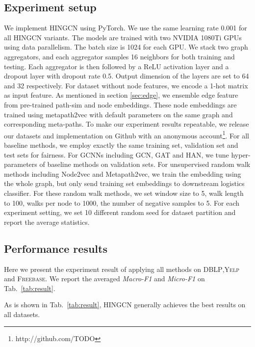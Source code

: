 \subsection{Experiment setup}
\label{sec:setup}
We implement HINGCN using PyTorch. We use the same learning rate 0.001 for all HINGCN variants. The models  are trained with two NVIDIA 1080Ti GPUs using data parallelism. The batch size is 1024 for each GPU. We stack two graph aggregators, and each aggregator samples 16 neighbors for both training and testing. Each aggregator is then followed by a ReLU activation layer and a dropout layer with dropout rate 0.5. Output dimension of the layers are set to 64 and 32 respectively. For dataset without node features, we encode a 1-hot matrix as input feature. As mentioned in section \ref{sec:edge}, we ensemble edge feature from pre-trained path-sim and node embeddings. These node embeddings are trained using metapath2vec \citep{DongCS17} with default parameters on the same graph and corresponding meta-paths. 
To make our experiment results repeatable, we release our datasets and implementation on Github with an anonymous account\footnote{http://github.com/TODO}.
For all baseline methods, we employ exactly the same training set, validation set and test sets for fairness. For GCNNs including GCN, GAT and HAN, we tune hyper-parameters of baseline methods on validation sets. For unsupervised random walk methods including Node2vec and Metapath2vec, we train the embedding using the whole graph, but only send training set embeddings to downstream logistics classifier. For these random walk methods, we set window size to 5, walk length to 100, walks per node to 1000, the number of negative samples to 5.
For each experiment setting, we set 10 different random seed for dataset partition and report the average statistics.

\subsection{Performance results}
\label{sec:results}

Here we present the experiment result of applying all  methods on \textsc{DBLP},\textsc{Yelp} and \textsc{Freebase}. We report the averaged \textit{Macro-F1} and \textit{Micro-F1} on Tab.~\ref{tab:result}.

As is shown in Tab.~\ref{tab:result}, HINGCN generally achieves the best results on all datasets.

